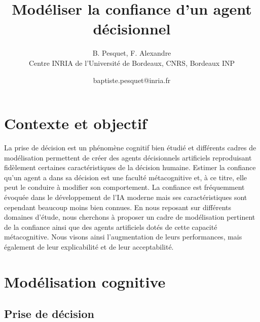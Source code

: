 \documentclass[french]{pfia}
\title{\textbf{Modéliser la confiance d'un agent décisionnel}}
\author{B. Pesquet\fup{1}, F. Alexandre\fup{1}\\[6pt]
\fup{1} Centre INRIA de l'Université de Bordeaux, CNRS, Bordeaux INP\\
}
\date{baptiste.pesquet@inria.fr}
\begin{document}
\maketitle







\section*{Contexte et objectif}

La prise de décision est un phénomène cognitif bien étudié et différents cadres de modélisation permettent de créer des agents décisionnels artificiels reproduisant fidèlement certaines caractéristiques de la décision humaine. Estimer la confiance qu'un agent a dans sa décision est une faculté métacognitive et, à ce titre, elle peut le conduire à modifier son comportement. La confiance est fréquemment évoquée dans le développement de l'IA moderne mais ses caractéristiques sont cependant beaucoup moins bien connues. En nous reposant sur différents domaines d'étude, nous cherchons à proposer un cadre de modélisation pertinent de la confiance ainsi que des agents artificiels dotés de cette capacité métacognitive. Nous visons ainsi l'augmentation de leurs performances, mais également de leur explicabilité et de leur acceptabilité. 


\section*{Modélisation cognitive}

\subsection*{Prise de décision}
\end{document}
